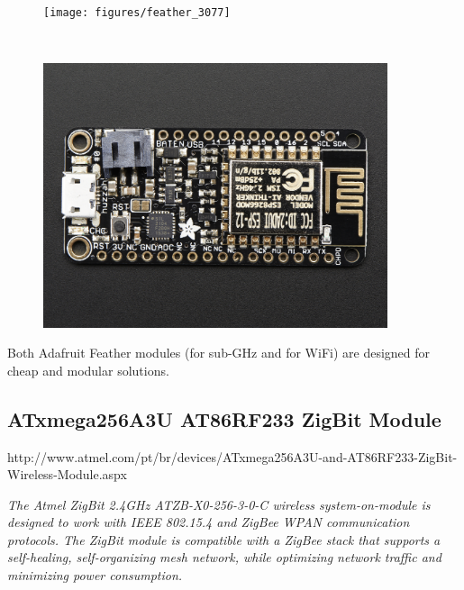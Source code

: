 
\vspace{-1em}
\begin{figure}[h!]
	\centering
	\begin{minipage}{.47\textwidth}
		\centering

		\texttt{[image: figures/feather\_3077]}

		\label{fig:test3}
	\end{minipage}%
	\begin{minipage}{.05\textwidth}
		\centering
		~
	\end{minipage}%
	\begin{minipage}{.47\textwidth}
		\centering
		\includegraphics[width=0.90\textwidth,keepaspectratio]{figures/feather_wifi}
		\label{fig:test4}
	\end{minipage}
\end{figure}

Both Adafruit Feather modules (for sub-GHz and for WiFi) are designed for cheap and modular solutions.

\subsection{ATxmega256A3U AT86RF233 ZigBit Module}

\begin{framed}
	
	http://www.atmel.com/pt/br/devices/ATxmega256A3U-and-AT86RF233-ZigBit-Wireless-Module.aspx
	
	\vspace{1em}
	\hline
	\vspace{1em}
\small	
	\textit{The Atmel ZigBit 2.4GHz ATZB-X0-256-3-0-C wireless system-on-module is designed to work with IEEE 802.15.4 and ZigBee WPAN communication protocols. The ZigBit module is compatible with a ZigBee stack that supports a self-healing, self-organizing mesh network, while optimizing network traffic and minimizing power consumption.}
\end{framed}

